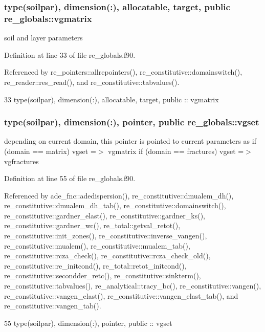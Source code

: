 \subsubsection[{vgmatrix}]{\setlength{\rightskip}{0pt plus 5cm}type({\bf soilpar}), dimension(\+:), allocatable, target, public re\+\_\+globals\+::vgmatrix}\label{namespacere__globals_ac218648bc51273025654afb2c7dbdc78}


soil and layer parameters 



Definition at line 33 of file re\+\_\+globals.\+f90.



Referenced by re\+\_\+pointers\+::allrepointers(), re\+\_\+constitutive\+::domainswitch(), re\+\_\+reader\+::res\+\_\+read(), and re\+\_\+constitutive\+::tabvalues().


\begin{DoxyCode}
33   \textcolor{keywordtype}{type}(soilpar), \textcolor{keywordtype}{dimension(:)}, \textcolor{keywordtype}{allocatable}, \textcolor{keywordtype}{target}, \textcolor{keywordtype}{public} :: vgmatrix
\end{DoxyCode}
\subsubsection[{vgset}]{\setlength{\rightskip}{0pt plus 5cm}type({\bf soilpar}), dimension(\+:), pointer, public re\+\_\+globals\+::vgset}\label{namespacere__globals_a8282c0352c56a66d819c88b9a4a84c34}


depending on current domain, this pointer is pointed to current parameters as if (domain == matrix) vgset =$>$ vgmatrix if (domain == fractures) vgset =$>$ vgfractures 



Definition at line 55 of file re\+\_\+globals.\+f90.



Referenced by ade\+\_\+fnc\+::adedispersion(), re\+\_\+constitutive\+::dmualem\+\_\+dh(), re\+\_\+constitutive\+::dmualem\+\_\+dh\+\_\+tab(), re\+\_\+constitutive\+::domainswitch(), re\+\_\+constitutive\+::gardner\+\_\+elast(), re\+\_\+constitutive\+::gardner\+\_\+ks(), re\+\_\+constitutive\+::gardner\+\_\+wc(), re\+\_\+total\+::getval\+\_\+retot(), re\+\_\+constitutive\+::init\+\_\+zones(), re\+\_\+constitutive\+::inverse\+\_\+vangen(), re\+\_\+constitutive\+::mualem(), re\+\_\+constitutive\+::mualem\+\_\+tab(), re\+\_\+constitutive\+::rcza\+\_\+check(), re\+\_\+constitutive\+::rcza\+\_\+check\+\_\+old(), re\+\_\+constitutive\+::re\+\_\+initcond(), re\+\_\+total\+::retot\+\_\+initcond(), re\+\_\+constitutive\+::secondder\+\_\+retc(), re\+\_\+constitutive\+::sinkterm(), re\+\_\+constitutive\+::tabvalues(), re\+\_\+analytical\+::tracy\+\_\+bc(), re\+\_\+constitutive\+::vangen(), re\+\_\+constitutive\+::vangen\+\_\+elast(), re\+\_\+constitutive\+::vangen\+\_\+elast\+\_\+tab(), and re\+\_\+constitutive\+::vangen\+\_\+tab().


\begin{DoxyCode}
55    \textcolor{keywordtype}{type}(soilpar), \textcolor{keywordtype}{dimension(:)}, \textcolor{keywordtype}{pointer}, \textcolor{keywordtype}{public} :: vgset
\end{DoxyCode}
